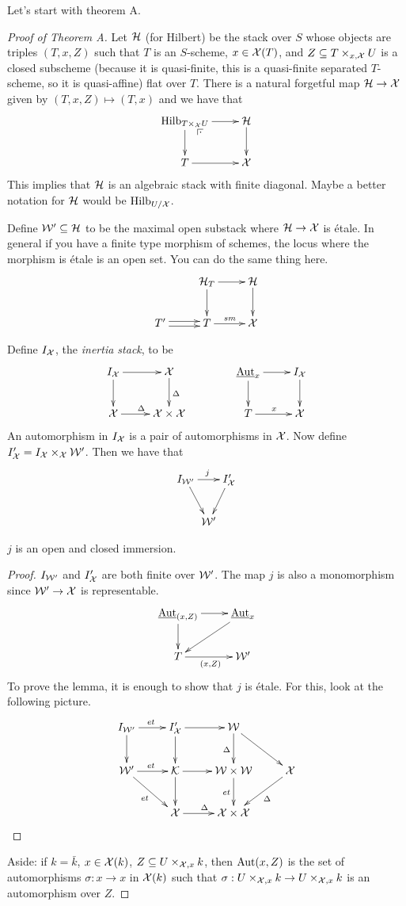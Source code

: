 Let's start with theorem A.
\begin{proof}[Proof of Theorem A]
  Let $\mathcal{H}$ (for Hilbert) be the stack over $S$ whose objects are
triples $(T,x,Z)$ such that $T$ is an $S$-scheme, $x\in \mathcal{X}(T)$, and
$Z\subseteq T\times_{x,\mathcal{X}} U$ is a closed subscheme (because it is
quasi-finite, this is a quasi-finite separated $T$-scheme, so it is
quasi-affine) flat over $T$. There is a natural forgetful map $\mathcal{H}\to
\mathcal{X}$ given by $(T,x,Z)\mapsto (T,x)$ and we have that
  \[\xymatrix{
    \hilb_{T\times_\X U} \ar@{}[dr]|(.25)\pb \ar[r]\ar[d] & \H\ar[d]\\
    T \ar[r] & \X
  }\]
  This implies that $\mathcal{H}$ is an algebraic stack with finite diagonal.
Maybe a better notation for $\mathcal{H}$ would be $\operatorname{Hilb}_{U/\mathcal{X}}$.

  Define $\mathcal{W}'\subseteq \mathcal{H}$ to be the maximal open substack where
$\mathcal{H}\to \mathcal{X}$ is \'etale. In general if you have a finite type morphism
of schemes, the locus where the morphism is \'etale is an open set.
You can do the same thing here.
  \[\xymatrix{
     & \H_T\ar[d] \ar[r] & \H\ar[d]\\
    T'\ar@<.5ex>[r]\ar@<-.5ex>[r] & T\ar[r]^{sm} & \X
  }\]

  Define $I_{\mathcal{X}}$, the \emph{inertia stack}, to be
  \[\xymatrix{
   I_\X \ar[r]\ar[d] & \X\ar[d]^\Delta\\
   \X\ar[r]^\Delta & \X\times \X
  }\qquad\qquad
  \xymatrix{
   \aut_x \ar[r]\ar[d] & I_\X\ar[d]\\
   T\ar[r]^x & \X
  }\]
  An automorphism in $I_{\mathcal{X}}$ is a pair of automorphisms in $\mathcal{X}$. Now
define $I_{\mathcal{X}}'=I_{\mathcal{X}}\times_{\mathcal{X}} \mathcal{W}'$. Then we have that
  \[\xymatrix@C-2pc{
    I_{\W'} \ar[dr]\ar[rr]^j& & I_\X' \ar[dl]\\
    & \W'
  }\]
  \begin{lemma}
   $j$ is an open and closed immersion.
  \end{lemma}
  \begin{proof}
   $I_{\mathcal{W}'}$ and $I_{\mathcal{X}}'$ are both finite over $\mathcal{W}'$. The map $j$ is
also a monomorphism since $\mathcal{W}'\to \mathcal{X}$ is representable.
   \[\xymatrix{
     \aut_{(x,Z)}\ar[r] \ar[d] & \aut_x\ar[dl]\\
     T\ar[r]_{(x,Z)}& \W'
   }\]
   To prove the lemma, it is enough to show that $j$ is \'etale. For
this, look at the following picture.
   \[\xymatrix{
    I_{\W'}\ar[d]\ar[r]^{et} & I_\X' \ar[r]\ar[d] &
\W\ar[d]_\Delta\ar[dr]\\
    \W'\ar[r]^{et}\ar[dr]_{et} & \K \ar[r]\ar[d] & \W\times
\W\ar[d]_{et} & \X\ar[dl]^\Delta\\
    & \X\ar[r]^\Delta & \X\times \X
   }\]
  \end{proof}
  Aside: if $k=\bar k$, $x\in \mathcal{X}(k)$, $Z\subseteq U\times_{\mathcal{X},x}k$,
then $\operatorname{Aut}(x,Z)$ is the set of automorphisms $\sigma:x\to x$ in
$\mathcal{X}(k)$ such that $\sigma:U\times_{\mathcal{X},x}k\to U\times_{\mathcal{X},x}k$ is an
automorphism over $Z$.


\end{proof}

